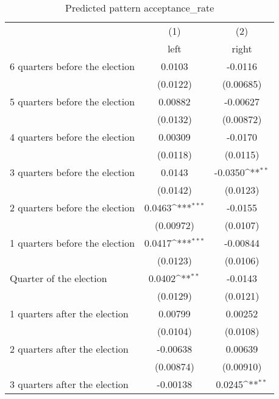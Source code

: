 \begin{table}[htbp]\centering
\def\sym#1{\ifmmode^{#1}\else\(^{#1}\)\fi}
\caption{Predicted pattern acceptance\_rate}
\begin{tabular}{l*{2}{c}}
\hline\hline
                    &\multicolumn{1}{c}{(1)}&\multicolumn{1}{c}{(2)}\\
                    &\multicolumn{1}{c}{left}&\multicolumn{1}{c}{right}\\
\hline
 6 quarters before the election&      0.0103         &     -0.0116         \\
                    &    (0.0122)         &   (0.00685)         \\
[1em]
 5 quarters before the election&     0.00882         &    -0.00627         \\
                    &    (0.0132)         &   (0.00872)         \\
[1em]
 4 quarters before the election&     0.00309         &     -0.0170         \\
                    &    (0.0118)         &    (0.0115)         \\
[1em]
 3 quarters before the election&      0.0143         &     -0.0350\sym{**} \\
                    &    (0.0142)         &    (0.0123)         \\
[1em]
 2 quarters before the election&      0.0463\sym{***}&     -0.0155         \\
                    &   (0.00972)         &    (0.0107)         \\
[1em]
 1 quarters before the election&      0.0417\sym{***}&    -0.00844         \\
                    &    (0.0123)         &    (0.0106)         \\
[1em]
Quarter of the election&      0.0402\sym{**} &     -0.0143         \\
                    &    (0.0129)         &    (0.0121)         \\
[1em]
 1 quarters after the election&     0.00799         &     0.00252         \\
                    &    (0.0104)         &    (0.0108)         \\
[1em]
 2 quarters after the election&    -0.00638         &     0.00639         \\
                    &   (0.00874)         &   (0.00910)         \\
[1em]
 3 quarters after the election&    -0.00138         &      0.0245\sym{**} \\

\end{tabular}
\end{table}
